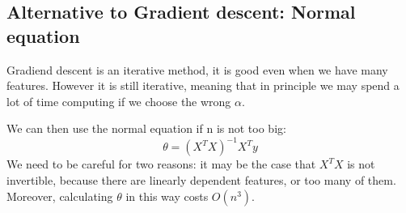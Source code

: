 \documentclass{article}
\begin{document}
\subsection{Alternative to Gradient descent: Normal equation}
Gradiend descent is an iterative method, it is good even when we have many features.
However it is still iterative, meaning that in principle we may spend a lot of time
computing if we choose the wrong $\alpha$.

We can then use the normal equation if n is not too big:
$$ \theta = (X^T X )^{-1} X^T y $$
We need to be careful for two reasons: it may be the case that $X^T X$ is not
invertible, because there are linearly dependent features, or too many of them.
Moreover, calculating $\theta$ in this way costs $O(n^3)$.
\end{document}
